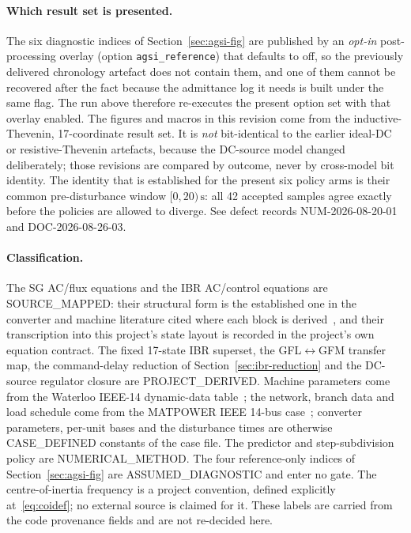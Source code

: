 \documentclass[12pt,a4paper]{article}
\theoremstyle{remark}
\newcommand{\second}{\,\mathrm{s}}
\begin{document}
\paragraph{Which result set is presented.}
\begin{sloppypar}
The six diagnostic indices of Section~\ref{sec:agsi-fig} are published by an
\emph{opt-in} post-processing overlay (option \texttt{agsi\_reference}) that
defaults to off, so the previously delivered chronology artefact does not contain
them, and one of them cannot be recovered after the fact because the admittance
log it needs is built under the same flag. The run above therefore re-executes
the present option set with that overlay enabled. The figures and macros in this
revision come from the inductive-Thevenin, 17-coordinate result set. It is
\emph{not} bit-identical to the earlier ideal-DC or resistive-Thevenin artefacts,
because the DC-source model changed deliberately; those revisions are compared
by outcome, never by cross-model bit identity. The identity that is established
for the present six policy arms is their common pre-disturbance window
$[0,20)\second$: all 42 accepted samples agree exactly before the policies are
allowed to diverge. See defect records \textsf{NUM-2026-08-20-01} and
\textsf{DOC-2026-08-26-03}.
\end{sloppypar}

\paragraph{Classification.}
\begin{sloppypar}
The SG AC/flux equations and the IBR AC/control equations are
\textsf{SOURCE\_\allowbreak MAPPED}: their structural form is the established one
in the converter and machine literature cited where each block is
derived~\cite{ieee1110,kundur1994,yazdani2010,teodorescu2011,sakimoto2015,regfmb1},
and their transcription into this project's state layout is recorded in the
project's own equation contract. The fixed 17-state IBR superset, the
GFL$\leftrightarrow$GFM transfer map, the command-delay reduction of
Section~\ref{sec:ibr-reduction} and the DC-source regulator closure are
\textsf{PROJECT\_\allowbreak DERIVED}. Machine parameters come from the Waterloo
IEEE-14 dynamic-data table~\cite{kodsi2003}; the network, branch data and load
schedule come from the MATPOWER IEEE 14-bus case~\cite{matpower}; converter
parameters, per-unit bases and the disturbance times are otherwise
\textsf{CASE\_\allowbreak DEFINED} constants of the case file. The predictor and
step-subdivision policy are \textsf{NUMERICAL\_\allowbreak METHOD}. The four
reference-only indices of Section~\ref{sec:agsi-fig} are
\textsf{ASSUMED\_\allowbreak DIAGNOSTIC} and enter no gate. The centre-of-inertia
frequency is a project convention, defined explicitly at~\eqref{eq:coidef}; no
external source is claimed for it. These labels are carried from the code
provenance fields and are not re-decided here.
\end{sloppypar}
\end{document}
